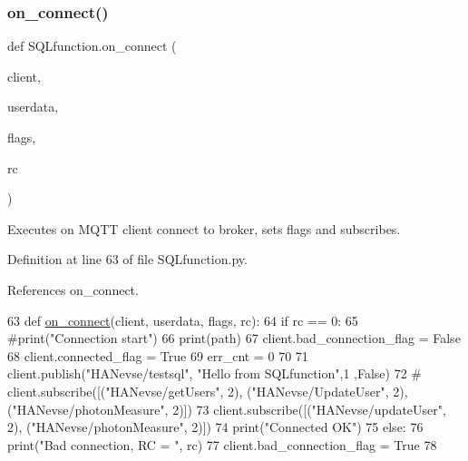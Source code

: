 \subsubsection{\texorpdfstring{on\+\_\+connect()}{on\_connect()}}
{\footnotesize\ttfamily def S\+Q\+Lfunction.\+on\+\_\+connect (\begin{DoxyParamCaption}\item[{}]{client,  }\item[{}]{userdata,  }\item[{}]{flags,  }\item[{}]{rc }\end{DoxyParamCaption})}



Executes on M\+Q\+TT client connect to broker, sets flags and subscribes. 



Definition at line 63 of file S\+Q\+Lfunction.\+py.



References on\+\_\+connect.


\begin{DoxyCode}
63 \textcolor{keyword}{def }\hyperlink{namespace_s_q_lfunction_a215e7090f82fbf0d31fd97be6721389a}{on\_connect}(client, userdata, flags, rc):
64     \textcolor{keywordflow}{if} rc == 0:
65         \textcolor{comment}{#print("Connection start")}
66         print(path)
67         client.bad\_connection\_flag = \textcolor{keyword}{False}
68         client.connected\_flag = \textcolor{keyword}{True}        
69         err\_cnt = 0
70 
71         client.publish(\textcolor{stringliteral}{"HANevse/testsql"}, \textcolor{stringliteral}{"Hello from SQLfunction"},1 ,\textcolor{keyword}{False})
72 \textcolor{comment}{#        client.subscribe([("HANevse/getUsers", 2), ("HANevse/UpdateUser", 2), ("HANevse/photonMeasure",
       2)])}
73         client.subscribe([(\textcolor{stringliteral}{"HANevse/updateUser"}, 2), (\textcolor{stringliteral}{"HANevse/photonMeasure"}, 2)])
74         print(\textcolor{stringliteral}{"Connected OK"})
75     \textcolor{keywordflow}{else}:
76         print(\textcolor{stringliteral}{"Bad connection, RC = "}, rc)
77         client.bad\_connection\_flag = \textcolor{keyword}{True}
78 
\end{DoxyCode}
\mbox{\label{namespace_s_q_lfunction_a3a3d48b63f188d8357c3422e417a58dc}} 
